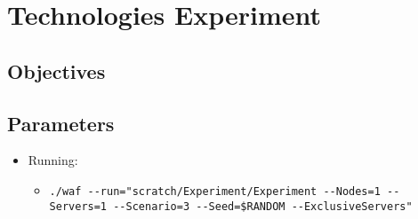 \documentclass[a4paper]{book}
\begin{document}
\section{Technologies Experiment}


\subsection{Objectives}


\subsection{Parameters}

\begin{itemize}
	\item[] Running:
	\begin{itemize}
		\item[] \footnotesize \begin{verbatim}./waf --run="scratch/Experiment/Experiment --Nodes=1 --Servers=1 --Scenario=3 --Seed=$RANDOM --ExclusiveServers"\end{verbatim}
	\end{itemize}
\end{itemize}
\end{document}
